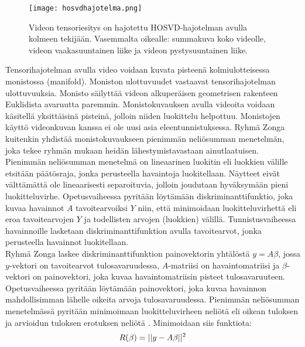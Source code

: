 \begin{figure}[htb]
  \begin{center}
    \texttt{[image: hosvdhajotelma.png]}
    \caption{Videon tensoriesitys on hajotettu HOSVD-hajotelman avulla kolmeen tekijään. Vasemmalta oikealle: summakuva koko videolle, videon vaakasuuntainen liike ja videon pystysuuntainen liike. \citep {6239180}}
    \label{fig:hosvdhajotelma}
  \end{center}
\end{figure}

Tensorihajotelman avulla video voidaan kuvata pisteenä kolmiulotteisessa monistossa (manifold). Moniston ulottuvuudet
vastaavat tensorihajotelman ulottuvuuksia. Monisto säilyttää videon 
alkuperäisen geometrisen rakenteen Euklidista avaruutta paremmin. \citep {Lui2012380} Monistokuvauksen avulla videoita voidaan käsitellä yksittäisinä
pisteinä, jolloin niiden luokittelu helpottuu. Monistojen käyttö videonkuvan kanssa ei ole uusi asia eleentunnistuksessa. 
Ryhmä Zonga kuitenkin yhdistää monistokuvaukseen pienimmän neliösumman menetelmän, joka tekee ryhmän mukaan heidän lähestymistavastaan
ainutlaatuisen.\citep {6239180}\\

Pienimmän neliösumman menetelmä on lineaarinen luokitin eli luokkien välille etsitään päätösraja, jonka perusteella havaintoja luokitellaan. 
Näytteet eivät välttämättä ole lineaarisesti separoituvia, jolloin joudutaan hyväksymään pieni luokitteluvirhe.
Opetusvaiheessa pyritään löytämään diskriminanttifunktio, joka kuvaa havainnot $A$ tavoitearvoiksi $Y$ niin, että minimoidaan luokitteluvirhettä eli eroa 
tavoitearvojen $Y$ ja todellisten arvojen (luokkien) välillä. Tunnistusvaiheessa havainnoille lasketaan diskriminanttifunktion avulla tavoitearvot, 
jonka perusteella havainnot luokitellaan. \citep{patternreg}\\

Ryhmä Zonga laskee diskriminanttifunktion painovektorin yhtälöstä $y = A\beta$, jossa $y$-vektori on tavoitearvot tulosavaruudessa, 
$A$-matriisi on havaintomatriisi ja $\beta$-vektori on painovektori, joka kuvaa havaintomatriisin pisteet tulosavaruuteen.
Opetusvaiheessa pyritään löytämään painovektori, joka kuvaa havainnon mahdollisimman lähelle oikeita arvoja
tulosavaruudessa. \citep {6239180} Pienimmän neliösumman menetelmässä pyritään minimoimaan luokitteluvirheen neliötä eli oikean tuloksen 
ja arvioidun tuloksen erotuksen neliötä \citep{patternreg}.
Minimoidaan siis funktiota:
\begin{equation}
R(\beta) = ||y-A\beta||^2 \\
\end{equation}

